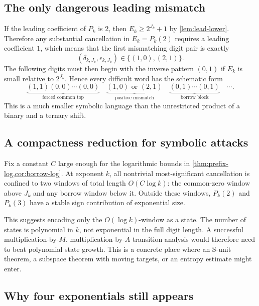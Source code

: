 \documentclass[11pt]{article}
\theoremstyle{definition}
\begin{document}
\subsection{The only dangerous leading mismatch}

If the leading coefficient of \(P_k\) is \(2\), then
\(E_k\ge2^{J_k}+1\) by \cref{lem:lead-lower}.  Therefore any substantial
cancellation in \(E_k=P_k(2)\) requires a leading coefficient \(1\), which
means that the first mismatching digit pair is exactly
\begin{equation}\label{eq:unit-mismatch-types}
 (\delta_{k,J_k},\epsilon_{k,J_k})\in\{(1,0),(2,1)\}.
\end{equation}
The following digits must then begin with the inverse pattern \((0,1)\) if
\(E_k\) is small relative to \(2^{J_k}\).  Hence every difficult word has
the schematic form
\begin{equation}\label{eq:word-schematic}
 \underbrace{(1,1)(0,0)\cdots(0,0)}_{\text{forced common top}}
 \quad
 \underbrace{(1,0)\text{ or }(2,1)}_{\text{positive mismatch}}
 \quad
 \underbrace{(0,1)\cdots(0,1)}_{\text{borrow block}}
 \quad\cdots.
\end{equation}
This is a much smaller symbolic language than the unrestricted product of a
binary and a ternary shift.

\subsection{A compactness reduction for symbolic attacks}

Fix a constant \(C\) large enough for the logarithmic bounds in
\cref{thm:prefix-log,cor:borrow-log}.  At exponent \(k\), all nontrivial
most-significant cancellation is confined to two windows of total length
\(O(C\log k)\): the common-zero window above \(J_k\) and any borrow window
below it.  Outside these windows, \(P_k(2)\) and \(P_k(3)\) have a stable
sign contribution of exponential size.

This suggests encoding only the \(O(\log k)\)-window as a state.  The number
of states is polynomial in \(k\), not exponential in the full digit length.
A successful multiplication-by-\(M\), multiplication-by-\(A\) transition
analysis would therefore need to beat polynomial state growth.  This is a
concrete place where an S-unit theorem, a subspace theorem with moving
targets, or an entropy estimate might enter.

\subsection{Why four exponentials still appears}
\end{document}
